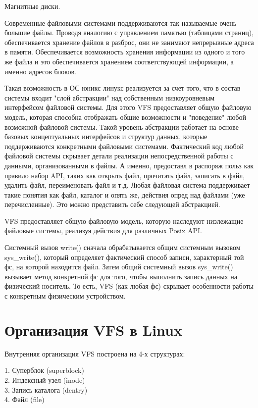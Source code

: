 Магнитные диски.

Современные файловыми системами поддерживаются так называемые очень большие файлы. Проводя аналогию с управлением памятью (таблицами страниц), обеспечивается хранение файлов в разброс, они не занимают непрерывные адреса в памяти. Обеспечивается возможность хранения информации из одного и того же файла и это обеспечивается хранением соответствующей информации, а именно адресов блоков.

Такая возможность в ОС юникс линукс реализуется за счет того, что в состав системы входит "слой абстракции" над собственным низкоуровневым интерфейсом файловой системы. Для этого VFS предоставляет общую файловую модель, которая способна отображать общие возможности и "поведение" любой возможной файловой системы. Такой уровень абстракции работает на основе базовых концептуальных интерфейсов и структур данных, которые поддерживаются конкретными файловыми системами. Фактический код любой файловой системы скрывает детали реализации непосредственной работы с данными, организованными в файлы. А именно, предоставл в распоряж польз как правило набор API, таких как открыть файл, прочитать файл, записать в файл, удалить файл, переименовать файл и т.д. Любая файловая система поддерживает такие понятия как файл, каталог и опять же, действия опред над файлами (уже перечисленные). Это можно представить себе следующей абстракцией.


\begin{figure}[H]
	\center{\texttt{[image: -6]}}
\end{figure}

VFS предоставляет общую файловую модель, которую наследуют низлежащие файловые системы, реализуя действия для различных Posix API.

Системный вызов write() сначала обрабатывается общим системным вызовом sys\_write(), который определяет фактический способ записи, характерный той фс, на которой находится файл. Затем общий системный вызов sys\_write() вызывает метод конкретной фс для того, чтобы выполнить запись данных на физический носитель. То есть, VFS (как любая фс) скрывает особенности работы с конкретным физическим устройством.

\section{Организация VFS в Linux}
Внутренняя организация VFS построена на 4-х структурах:

1. Суперблок (superblock)\\
2. Индексный узел (inode)\\
3. Запись каталога (dentry)\\
4. Файл (file)\\

